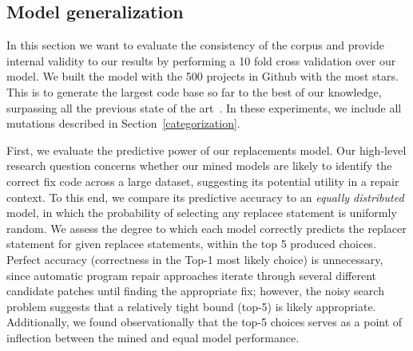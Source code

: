 \documentclass[conference]{IEEEtran}
\newcommand{\todo}[1]
  {{\scriptsize \textbf{\color{red} {#1}}}}
\begin{document}
\subsection{Model generalization}
\label{sec:generalize}
  


In this section we want to evaluate the consistency of the corpus and provide internal validity to our results by performing a 10 fold cross validation over our model. We built the model with the 500
projects in Github with the most stars.
 This is to generate the largest code base so far to the best 
of our knowledge, surpassing all the previous state of the 
art~\cite{long16proph,Soto16,zhong15,martinez15,xuan16}. 
In these experiments, we include all mutations described in
Section~\ref{categorization}.

First, we evaluate the predictive power of our 
replacements model. Our high-level research question concerns whether 
our mined models are likely to identify the correct fix code across a large
dataset, suggesting its potential utility in a repair context.  To this end, we
compare its predictive accuracy to an \emph{equally distributed} model, in which
the probability of selecting any replacee statement is uniformly random. 
We assess the degree to which each model correctly predicts the
replacer statement for given replacee statements, within the top 5 produced
choices. Perfect accuracy (correctness in the Top-1 most likely choice) is unnecessary, since automatic program repair approaches iterate through several different candidate patches until finding the appropriate fix;
however, the noisy search problem suggests that a relatively tight bound (top-5)
is likely appropriate.  Additionally, we found observationally that the top-5
choices serves as a point of inflection between the mined and equal model
performance. 
\end{document}
